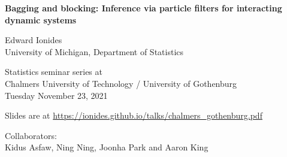 \documentclass{beamer}
\begin{document}
\begin{frame}
\begin{center}
  {\Large\bf Bagging and blocking: Inference via particle filters for interacting dynamic systems}
  

\vspace{2mm}

Edward Ionides\\
University of Michigan, Department of Statistics

\vspace{8mm}

Statistics seminar series at \\
Chalmers University of Technology /
University of Gothenburg
\\
Tuesday November 23, 2021
\\

\hspace{3mm}

Slides are at \url{https://ionides.github.io/talks/chalmers_gothenburg.pdf}

\vspace{8mm}

Collaborators:\\
Kidus Asfaw, Ning Ning, Joonha Park and Aaron King\\

\end{center}

\end{frame}
\end{document}
